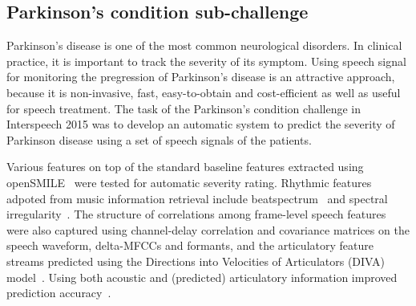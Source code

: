 \documentclass{article}
\begin{document}


\subsection{Parkinson's condition sub-challenge}
Parkinson's disease is one of the most common neurological disorders.
In clinical practice, it is important to track the severity of its symptom.
Using speech signal for monitoring the pregression of Parkinson's disease is an attractive approach, because it is non-invasive, fast, easy-to-obtain and cost-efficient as well as useful for speech treatment.
The task of the Parkinson's condition challenge in Interspeech 2015 was to develop an automatic system to predict the severity of Parkinson disease using a set of speech signals of the patients.

Various features on top of the standard baseline features extracted using openSMILE~\cite{eyben2010themunich} were tested for automatic severity rating.
Rhythmic features adpoted from music information retrieval include beatspectrum~\cite{foote2002audio} and spectral irregularity~\cite{jensen1999timbre}.
The structure of correlations among frame-level speech features were also captured using channel-delay correlation and covariance matrices on the speech waveform, delta-MFCCs and formants, and the articulatory feature streams predicted using the Directions into Velocities of Articulators (DIVA) model~\cite{guenther2006neural,williamson2015segment}.
Using both acoustic and (predicted) articulatory information improved prediction accuracy~\cite{hahm2015parkinson}.
\end{document}
